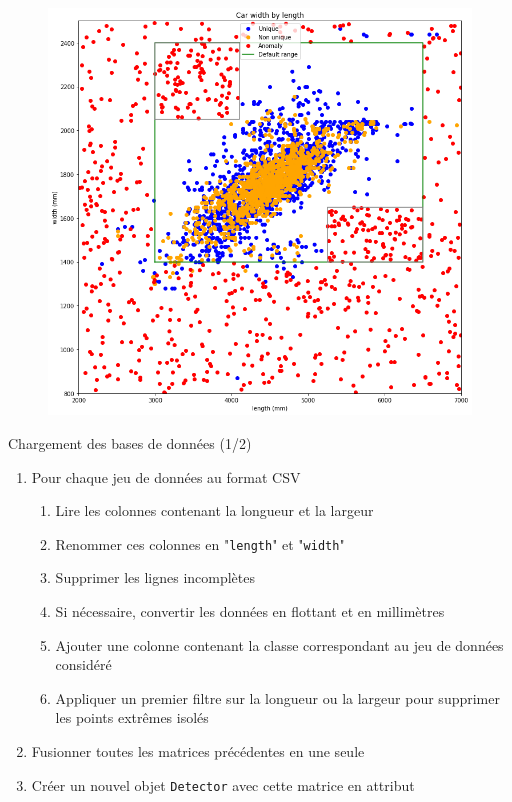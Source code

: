\documentclass[usenames,dvipsnames]{beamer}
\begin{document}
\begin{frame}
\begin{figure}
\centering
\includegraphics[width=.8\textwidth]{img/first_try.png}
\end{figure}
\end{frame}

\begin{frame}{Chargement des bases de données (1/2)}

\begin{enumerate}
\item Pour chaque jeu de données au format CSV
\begin{enumerate}[{1.}1.]
\item Lire les colonnes contenant la longueur et la largeur
\item Renommer ces colonnes en "\texttt{length}" et "\texttt{width}"
\item Supprimer les lignes incomplètes
\item Si nécessaire, convertir les données en flottant et en millimètres
\item Ajouter une colonne contenant la classe correspondant au jeu de données considéré
\item Appliquer un premier filtre sur la longueur ou la largeur pour supprimer les points extrêmes isolés
\end{enumerate}
\item Fusionner toutes les matrices précédentes en une seule
\item Créer un nouvel objet \texttt{Detector} avec cette matrice en attribut
\end{enumerate}

\end{frame}
\end{document}
